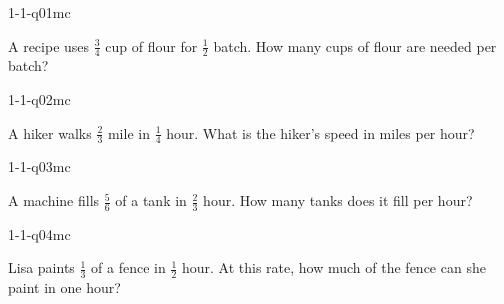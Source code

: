 

\begin{practiceQuestion}{1-1-q01}{mc}
\begin{questionText}
A recipe uses $\frac{3}{4}$ cup of flour for $\frac{1}{2}$ batch. How many cups of flour are needed per batch?
\end{questionText}
\end{practiceQuestion}

\begin{practiceQuestion}{1-1-q02}{mc}
\begin{questionText}
A hiker walks $\frac{2}{3}$ mile in $\frac{1}{4}$ hour. What is the hiker's speed in miles per hour?
\end{questionText}
\end{practiceQuestion}

\begin{practiceQuestion}{1-1-q03}{mc}
\begin{questionText}
A machine fills $\frac{5}{6}$ of a tank in $\frac{2}{3}$ hour. How many tanks does it fill per hour?
\end{questionText}
\end{practiceQuestion}

\begin{practiceQuestion}{1-1-q04}{mc}
\begin{questionText}
Lisa paints $\frac{1}{3}$ of a fence in $\frac{1}{2}$ hour. At this rate, how much of the fence can she paint in one hour?
\end{questionText}
\end{practiceQuestion}

